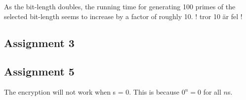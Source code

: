 \documentclass[11pt,a4paper]{article}
\begin{document}
As the bit-length doubles, the running time for generating 100 primes of the selected bit-length seems to increase by a factor of roughly 10. ! tror 10 är fel !

\subsection{Assignment 3}

\subsection{Assignment 5}

The encryption will not work when s = 0. This is because $0^n = 0$ for all $n$s.
\end{document}
